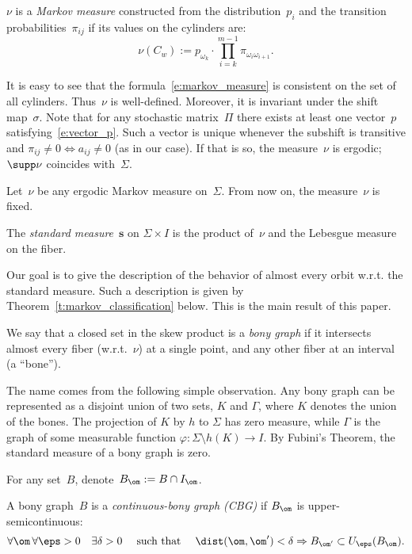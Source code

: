 \documentclass[a4paper,12pt]{amsart}
\begin{document}
\begin{Def}
$\nu$ is a \emph{Markov measure} constructed from the distribution~$p_i$ and the transition probabilities~$\pi_{ij}$ if its values on the cylinders are:
\begin{equation}    \label{e:markov_measure}
\nu(C_w) := p_{\omega_{k}} \cdot \prod\limits_{i=k}^{m-1} \pi_{\omega_{i} \omega_{i+1}}.
\end{equation}
\end{Def}

It is easy to see that the formula~\eqref{e:markov_measure} is consistent on the set of all cylinders. Thus~$\nu$ is well-defined. Moreover, it is invariant under the shift map~$\sigma$. Note that for any stochastic matrix~$\Pi$ there exists at least one vector~$p$ satisfying~\eqref{e:vector_p}. Such a vector is unique whenever the subshift is transitive and $\pi_{ij} \ne 0 \Leftrightarrow a_{ij} \ne 0$ (as in our case). If that is so, the measure~$\nu$ is ergodic; $\supp \nu$ coincides with~$\Sigma$.

Let~$\nu$ be any ergodic Markov measure on~$\Sigma$. From now on, the measure~$\nu$ is fixed.
\begin{Def} \label{d:std}
The \emph{standard measure}~$\mathbf{s}$ on $\Sigma \times I$ is the product of~$\nu$ and the Lebesgue measure on the fiber.
\end{Def}

Our goal is to give the description of the behavior of almost every orbit w.r.t. the standard measure. Such a description is given by Theorem~\ref{t:markov_classification} below. This is the main result of this paper.

\begin{Def}
We say that a closed set in the skew product is a \emph{bony graph} if it
intersects almost every fiber (w.r.t.~$\nu$) at a single point, and any
other fiber at an interval (a ``bone'').
\end{Def}

The name comes from the following simple observation. Any bony graph can be represented as a disjoint union of two sets, $K$ and $\Gamma$, where $K$ denotes the union of the bones. The projection of $K$ by $h$ to $\Sigma$ has zero measure, while $\Gamma$ is the graph of some measurable function $\varphi:\Sigma\setminus h(K)\to I$. By Fubini's Theorem, the standard measure of a bony graph is zero.

For any set~$B$, denote~$B_\om := B \cap I_\om$.
\begin{Def} \label{d:continuous-bony}
A bony graph~$B$ is a \emph{continuous-bony graph (CBG)} if $B_\om$ is upper-semicontinuous:
$$
\forall \om \, \forall \eps > 0 \quad \exists \delta > 0 \quad \text{ such that } \quad \dist(\om, \om') < \delta \Rightarrow B_{\om'} \subset U_\eps (B_\om).
$$
\end{Def}
\end{document}
